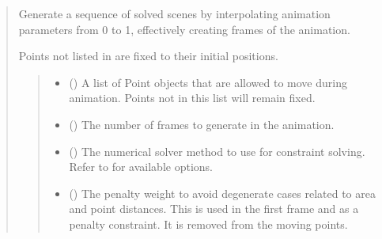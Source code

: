 \documentclass[letterpaper,10pt,english]{sphinxmanual}
\begin{document}
\begin{quote}
\begin{fulllineitems}
\begin{fulllineitems}
\label{\detokenize{pygeox:pygeox.animate.AnimateNamespace.run}}
\pysigstartsignatures
\pysiglinewithargsret
{}
{\sphinxparamcomma {}\sphinxparamcomma {}\sphinxparamcomma {}\sphinxparamcomma {}\sphinxparamcomma {}}
{}
\pysigstopsignatures
\sphinxAtStartPar
Generate a sequence of solved scenes by interpolating animation parameters
from 0 to 1, effectively creating frames of the animation.

\sphinxAtStartPar
Points not listed in  are fixed to their initial positions.
\begin{quote}\begin{description}
\begin{itemize}
\item {} 
\sphinxAtStartPar
{} (\sphinxstyleliteralemphasis{\sphinxupquote{{[}}}\sphinxstyleliteralemphasis{\sphinxupquote{{]}}}) \textendash{} A list of Point objects that are allowed to move during animation.
Points not in this list will remain fixed.

\item {} 
\sphinxAtStartPar
{} () \textendash{} The number of frames to generate in the animation.

\item {} 
\sphinxAtStartPar
{} () \textendash{} The numerical solver method to use for constraint solving.
Refer to  for available options.

\item {} 
\sphinxAtStartPar
{} (\sphinxstyleliteralemphasis{\sphinxupquote{ | }}) \textendash{} The penalty weight to avoid degenerate cases related to
area and point distances. This is used in the first frame
and as a penalty constraint. It is removed from the moving points.


\end{itemize}
\end{description}
\end{quote}
\end{fulllineitems}
\end{fulllineitems}
\end{quote}
\end{document}
